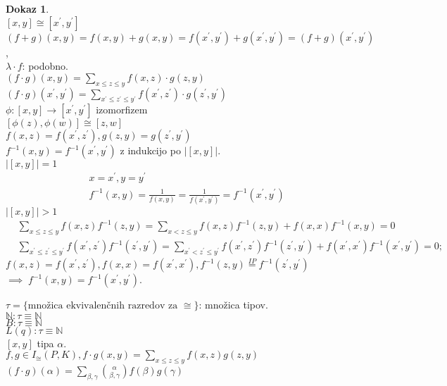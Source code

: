 \documentclass[a4paper, 12pt]{book}
\theoremstyle{definition}
\newtheorem{pro}[counter]{Dokaz}
\theoremstyle{remark}
\newcommand{\N}{\mathbb{N}}
\begin{document}
\begin{pro} \text{} \\
  $[x, y] \cong [x^{'}, y^{'}]$ \\
  $(f+g)(x,y) = f(x,y) + g(x,y) = f(x^{'}, y^{'}) + g(x^{'}, y^{'}) = (f+g)(x^{'}, y^{'})$, \\
  $\lambda \cdot f$: podobno. \\
  $(f \cdot g) (x, y) = \sum_{x \leq z \leq y} f(x, z) \cdot g(z, y)$ \\
  $(f \cdot g) (x^{'}, y^{'}) = \sum_{x^{'} \leq z^{'} \leq y^{'}} f(x^{'}, z^{'}) \cdot g(z^{'}, y^{'})$ \\
  $\phi: [x, y] \to [x^{'}, y^{'}]$ izomorfizem \\
  $[\phi(z), \phi(w)] \cong [z, w]$ \\
  $f(x, z) = f(x^{'}, z^{'}), g(z, y) = g(z^{'}, y^{'})$ \\
  $f^{-1}(x,y) = f^{-1}(x^{'}, y^{'})$ z indukcijo po $\left|[x,y]\right|$. \\
  $\left|[x,y]\right| = 1$
  \begin{align*}
    &x = x^{'}, y = y^{'} \\
    &f^{-1}(x,y) = \frac{1}{f(x,y)} = \frac{1}{f(x^{'}, y^{'})} = f^{-1}(x^{'}, y^{'})
  \end{align*}
  $\left|[x,y]\right| > 1$
  \begin{align*}
    &\sum_{x \leq z \leq y} f(x,z) f^{-1}(z,y) = \sum_{x < z \leq y} f(x,z) f^{-1}(z,y) + f(x,x) f^{-1}(x,y) = 0 \\
    &\sum_{x^{'} \leq z^{'} \leq y^{'}} f(x^{'},z^{'}) f^{-1}(z^{'},y^{'}) =
      \sum_{x^{'} < z^{'} \leq y^{'}} f(x^{'},z^{'}) f^{-1}(z^{'},y^{'}) + f(x^{'},x^{'}) f^{-1}(x^{'},y^{'}) = 0;
  \end{align*}
  $f(x, z) = f(x^{'}, z^{'}), f(x, x) = f(x^{'}, x^{'}), f^{-1}(z,y) \stackrel{IP}{=} f^{-1}(z^{'}, y^{'})$ \\
  $\implies \; f^{-1}(x,y) = f^{-1}(x^{'}, y^{'})$.
\end{pro}
$\tau = \{\text{množica ekvivalenčnih razredov za } \cong\}$: množica tipov. \\
$\N: \tau \equiv \N$ \\
$B: \tau \equiv \N$ \\
$L(q): \tau \equiv \N$ \\
$[x,y]$ tipa $\alpha$. \\
$f,g \in I_{\cong}(P, K), f \cdot g(x, y) = \sum_{x \leq z \leq y} f(x, z) g(z, y)$ \\
$(f \cdot g)(\alpha) = \sum_{\beta, \gamma} \binom{\alpha}{\beta, \gamma} f(\beta) g(\gamma)$ \\
\end{document}
